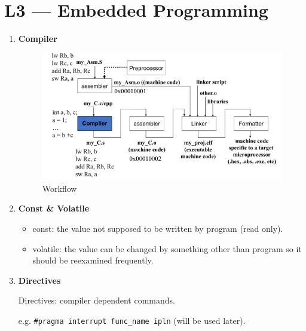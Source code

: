 \documentclass[a4paper]{article}
\begin{document}
\section*{L3 --- Embedded Programming}
  \begin{enumerate}[label = \arabic*.]
    \item \textbf{Compiler}
      \begin{figure}[H]
        \centering
        \includegraphics[width=0.9\linewidth]{Program_build_flow.jpeg}
        \caption{Workflow}
        \label{fig:Program_build_flow.jpeg}
      \end{figure}

    \item \textbf{Const \& Volatile}
      \begin{itemize}[leftmargin = 1cm]
        \item const: the value not supposed to be written by program (read only).
        \item volatile: the value can be changed by something other than program so it should be reexamined frequently.
      \end{itemize}
    \item \textbf{Directives}
      \par Directives: compiler dependent commands.
      \par e.g. \verb|#pragma interrupt func_name ipln| (will be used later).
  \end{enumerate}
\end{document}
